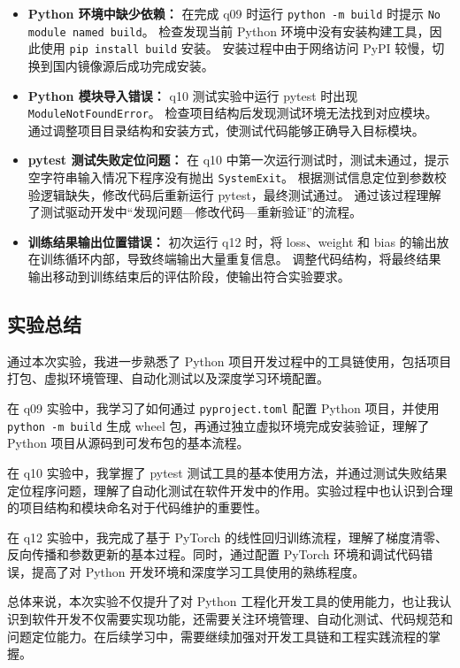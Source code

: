 \documentclass[UTF8,a4paper,11pt]{ctexart}
\begin{document}
\begin{itemize}[leftmargin=2em]

\item \textbf{Python 环境中缺少依赖：}
在完成 q09 时运行 \texttt{python -m build} 时提示 \texttt{No module named build}。
检查发现当前 Python 环境中没有安装构建工具，因此使用 \texttt{pip install build} 安装。
安装过程中由于网络访问 PyPI 较慢，切换到国内镜像源后成功完成安装。

\item \textbf{Python 模块导入错误：}
q10 测试实验中运行 pytest 时出现 \texttt{ModuleNotFoundError}。
检查项目结构后发现测试环境无法找到对应模块。
通过调整项目目录结构和安装方式，使测试代码能够正确导入目标模块。

\item \textbf{pytest 测试失败定位问题：}
在 q10 中第一次运行测试时，测试未通过，提示空字符串输入情况下程序没有抛出 \texttt{SystemExit}。
根据测试信息定位到参数校验逻辑缺失，修改代码后重新运行 pytest，最终测试通过。
通过该过程理解了测试驱动开发中“发现问题—修改代码—重新验证”的流程。

\item \textbf{训练结果输出位置错误：}
初次运行 q12 时，将 loss、weight 和 bias 的输出放在训练循环内部，导致终端输出大量重复信息。
调整代码结构，将最终结果输出移动到训练结束后的评估阶段，使输出符合实验要求。

\end{itemize}


\subsection{实验总结}

通过本次实验，我进一步熟悉了 Python 项目开发过程中的工具链使用，包括项目打包、虚拟环境管理、自动化测试以及深度学习环境配置。

在 q09 实验中，我学习了如何通过 \texttt{pyproject.toml} 配置 Python 项目，并使用 \texttt{python -m build} 生成 wheel 包，再通过独立虚拟环境完成安装验证，理解了 Python 项目从源码到可发布包的基本流程。

在 q10 实验中，我掌握了 pytest 测试工具的基本使用方法，并通过测试失败结果定位程序问题，理解了自动化测试在软件开发中的作用。实验过程中也认识到合理的项目结构和模块命名对于代码维护的重要性。

在 q12 实验中，我完成了基于 PyTorch 的线性回归训练流程，理解了梯度清零、反向传播和参数更新的基本过程。同时，通过配置 PyTorch 环境和调试代码错误，提高了对 Python 开发环境和深度学习工具使用的熟练程度。

总体来说，本次实验不仅提升了对 Python 工程化开发工具的使用能力，也让我认识到软件开发不仅需要实现功能，还需要关注环境管理、自动化测试、代码规范和问题定位能力。在后续学习中，需要继续加强对开发工具链和工程实践流程的掌握。
\end{document}
